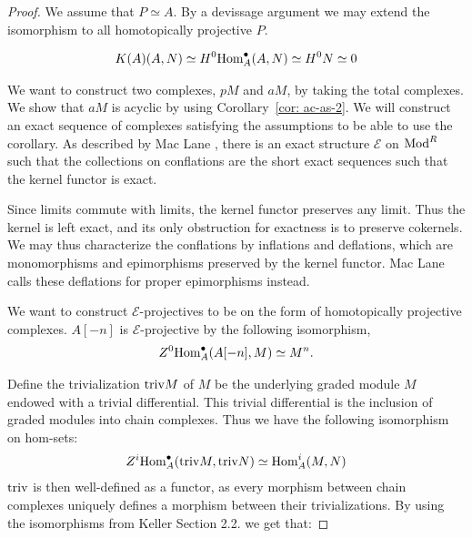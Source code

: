 \documentclass[../thesis.tex]{subfiles}
\begin{document}
            \begin{proof}
                We assume that $P \simeq A$. By a devissage argument we may extend the isomorphism to all homotopically projective $P$. 

                \begin{align*}
                    K(A)(A, N) \simeq H^0 {\tt{Hom}}^\bullet_A (A, N) \simeq H^0 N \simeq 0
                \end{align*}

                We want to construct two complexes, $pM$ and $aM$, by taking the total complexes. We show that $aM$ is acyclic by using Corollary~\ref{cor: ac-as-2}. We will construct an exact sequence of complexes satisfying the assumptions to be able to use the corollary. As described by Mac Lane \cite{MacLane94}, there is an exact structure $\mathcal{E}$ on $\tt{Mod}^R$ such that the collections on conflations are the short exact sequences such that the kernel functor is exact.
                \begin{center}
                \end{center}

                Since limits commute with limits, the kernel functor preserves any limit. Thus the kernel is left exact, and its only obstruction for exactness is to preserve cokernels. We may thus characterize the conflations by inflations and deflations, which are monomorphisms and epimorphisms preserved by the kernel functor. Mac Lane calls these deflations for proper epimorphisms instead.

                We want to construct $\mathcal{E}$-projectives to be on the form of homotopically projective complexes. $A[-n]$ is $\mathcal{E}$-projective by the following isomorphism,
                \begin{align*}
                    Z^0\tt{Hom}_A^\bullet (A[-n], M) \simeq M^n\tt{.}
                \end{align*}

                Define the trivialization $\tt{triv}M$ of $M$ be the underlying graded module $M$ endowed with a trivial differential. This trivial differential is the inclusion of graded modules into chain complexes. Thus we have the following isomorphism on hom-sets:
                \begin{align*}
                    Z^i\tt{Hom}_A^\bullet(\tt{triv}M, \tt{triv}N) \simeq \tt{Hom}_A^i(M, N)
                \end{align*}
                $\tt{triv}$ is then well-defined as a functor, as every morphism between chain complexes uniquely defines a morphism between their trivializations. By using the isomorphisms from Keller \cite{Keller94} Section 2.2. we get that:


\end{proof}
\end{document}
